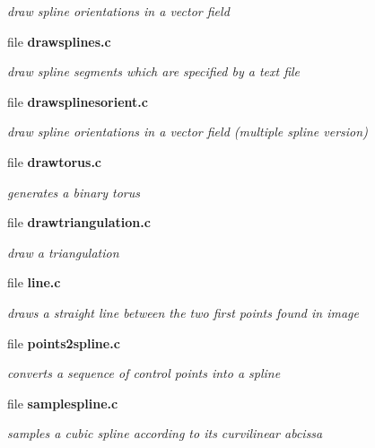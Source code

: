 \begin{DoxyCompactItemize}
\begin{DoxyCompactList}\small\item\em draw spline orientations in a vector field \item\end{DoxyCompactList}

\item 
file {\bf drawsplines.c}


\begin{DoxyCompactList}\small\item\em draw spline segments which are specified by a text file \item\end{DoxyCompactList}

\item 
file {\bf drawsplinesorient.c}


\begin{DoxyCompactList}\small\item\em draw spline orientations in a vector field (multiple spline version) \item\end{DoxyCompactList}

\item 
file {\bf drawtorus.c}


\begin{DoxyCompactList}\small\item\em generates a binary torus \item\end{DoxyCompactList}

\item 
file {\bf drawtriangulation.c}


\begin{DoxyCompactList}\small\item\em draw a triangulation \item\end{DoxyCompactList}

\item 
file {\bf line.c}


\begin{DoxyCompactList}\small\item\em draws a straight line between the two first points found in image \item\end{DoxyCompactList}

\item 
file {\bf points2spline.c}


\begin{DoxyCompactList}\small\item\em converts a sequence of control points into a spline \item\end{DoxyCompactList}

\item 
file {\bf samplespline.c}


\begin{DoxyCompactList}\small\item\em samples a cubic spline according to its curvilinear abcissa \item\end{DoxyCompactList}

\end{DoxyCompactItemize}
